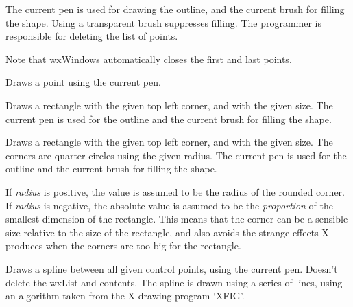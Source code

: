 The current pen is used for drawing the outline, and the current brush
for filling the shape.  Using a transparent brush suppresses filling.
The programmer is responsible for deleting the list of points.

Note that wxWindows automatically closes the first and last points.



Draws a point using the current pen.



Draws a rectangle with the given top left corner, and with the given
size.  The current pen is used for the outline and the current brush
for filling the shape.



Draws a rectangle with the given top left corner, and with the given
size.  The corners are quarter-circles using the given radius. The
current pen is used for the outline and the current brush for filling
the shape.

If {\it radius} is positive, the value is assumed to be the
radius of the rounded corner. If {\it radius} is negative,
the absolute value is assumed to be the {\it proportion} of the smallest
dimension of the rectangle. This means that the corner can be
a sensible size relative to the size of the rectangle, and also avoids
the strange effects X produces when the corners are too big for
the rectangle.



Draws a spline between all given control points, using the current
pen.  Doesn't delete the wxList and contents. The spline is drawn
using a series of lines, using an algorithm taken from the X drawing
program `XFIG'.



